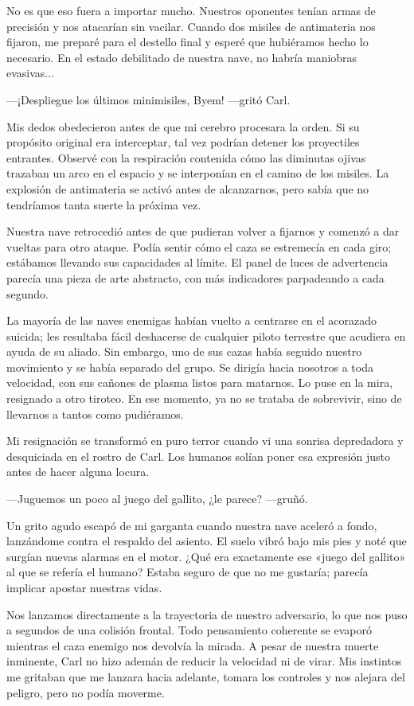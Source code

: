 No es que eso fuera a importar mucho. Nuestros oponentes tenían armas de precisión y nos atacarían sin vacilar. Cuando dos misiles de antimateria nos fijaron, me preparé para el destello final y esperé que hubiéramos hecho lo necesario. En el estado debilitado de nuestra nave, no habría maniobras evasivas...

—¡Despliegue los últimos minimisiles, Byem! —gritó Carl.

Mis dedos obedecieron antes de que mi cerebro procesara la orden. Si su propósito original era interceptar, tal vez podrían detener los proyectiles entrantes. Observé con la respiración contenida cómo las diminutas ojivas trazaban un arco en el espacio y se interponían en el camino de los misiles. La explosión de antimateria se activó antes de alcanzarnos, pero sabía que no tendríamos tanta suerte la próxima vez.

Nuestra nave retrocedió antes de que pudieran volver a fijarnos y comenzó a dar vueltas para otro ataque. Podía sentir cómo el caza se estremecía en cada giro; estábamos llevando sus capacidades al límite. El panel de luces de advertencia parecía una pieza de arte abstracto, con más indicadores parpadeando a cada segundo.

La mayoría de las naves enemigas habían vuelto a centrarse en el acorazado suicida; les resultaba fácil deshacerse de cualquier piloto terrestre que acudiera en ayuda de su aliado. Sin embargo, uno de sus cazas había seguido nuestro movimiento y se había separado del grupo. Se dirigía hacia nosotros a toda velocidad, con sus cañones de plasma listos para matarnos. Lo puse en la mira, resignado a otro tiroteo. En ese momento, ya no se trataba de sobrevivir, sino de llevarnos a tantos como pudiéramos.

Mi resignación se transformó en puro terror cuando vi una sonrisa depredadora y desquiciada en el rostro de Carl. Los humanos solían poner esa expresión justo antes de hacer alguna locura.

—Juguemos un poco al juego del gallito, ¿le parece? —gruñó.

Un grito agudo escapó de mi garganta cuando nuestra nave aceleró a fondo, lanzándome contra el respaldo del asiento. El suelo vibró bajo mis pies y noté que surgían nuevas alarmas en el motor. ¿Qué era exactamente ese «juego del gallito» al que se refería el humano? Estaba seguro de que no me gustaría; parecía implicar apostar nuestras vidas.

Nos lanzamos directamente a la trayectoria de nuestro adversario, lo que nos puso a segundos de una colisión frontal. Todo pensamiento coherente se evaporó mientras el caza enemigo nos devolvía la mirada. A pesar de nuestra muerte inminente, Carl no hizo ademán de reducir la velocidad ni de virar. Mis instintos me gritaban que me lanzara hacia adelante, tomara los controles y nos alejara del peligro, pero no podía moverme.

